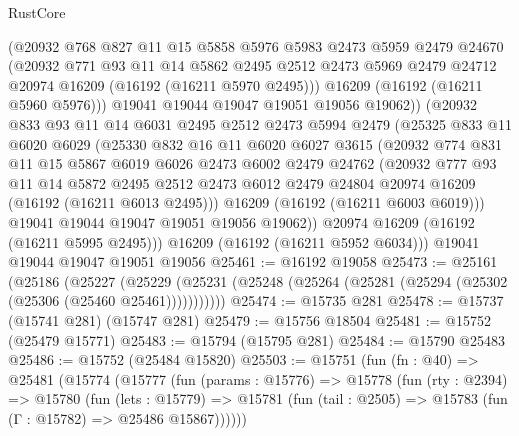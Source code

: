 \begin{lexlean}{RustCore}
\begin{coremodule}
          (@20932
            @768
            @827
            @11
            @15
            @5858
            @5976
            @5983
            @2473
            @5959
            @2479
            @24670
            (@20932
              @771
              @93
              @11
              @14
              @5862
              @2495
              @2512
              @2473
              @5969
              @2479
              @24712
              @20974
              @16209
              (@16192 (@16211 @5970 @2495)))
            @16209
            (@16192 (@16211 @5960 @5976)))
          @19041
          @19044
          @19047
          @19051
          @19056
          @19062))
      (@20932
        @833
        @93
        @11
        @14
        @6031
        @2495
        @2512
        @2473
        @5994
        @2479
        (@25325
          @833
          @11
          @6020
          @6029
          (@25330
            @832
            @16
            @11
            @6020
            @6027
            @3615
            (@20932
              @774
              @831
              @11
              @15
              @5867
              @6019
              @6026
              @2473
              @6002
              @2479
              @24762
              (@20932
                @777
                @93
                @11
                @14
                @5872
                @2495
                @2512
                @2473
                @6012
                @2479
                @24804
                @20974
                @16209
                (@16192 (@16211 @6013 @2495)))
              @16209
              (@16192 (@16211 @6003 @6019)))
            @19041
            @19044
            @19047
            @19051
            @19056
            @19062))
        @20974
        @16209
        (@16192 (@16211 @5995 @2495)))
      @16209
      (@16192 (@16211 @5952 @6034)))
    @19041
    @19044
    @19047
    @19051
    @19056
@25461 := @16192 @19058
@25473 := @25161
    (@25186
      (@25227
        (@25229 (@25231 (@25248 (@25264 (@25281 (@25294 (@25302 (@25306 (@25460 @25461)))))))))))
@25474 := @15735 @281
@25478 := @15737 (@15741 @281) (@15747 @281)
@25479 := @15756 @18504
@25481 := @15752 (@25479 @15771)
@25483 := @15794 (@15795 @281)
@25484 := @15790 @25483
@25486 := @15752 (@25484 @15820)
@25503 := @15751
    (fun (fn : @40) =>
    @25481
      (@15774
        (@15777
          (fun (params : @15776) =>
          @15778
            (fun (rty : @2394) =>
            @15780
              (fun (lets : @15779) =>
              @15781 (fun (tail : @2505) => @15783 (fun (Γ : @15782) => @25486 @15867))))))

\end{coremodule}
\end{lexlean}
